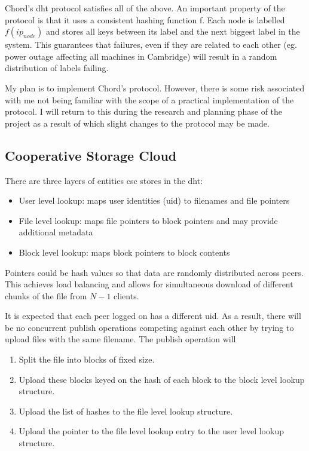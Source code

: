 \documentclass[12pt]{article}
\begin{document}
Chord's \gls{dht} protocol satisfies all of the above. \cite{chord} An important property of the protocol is that it uses a consistent hashing function f. Each node is labelled $f(ip_{node})$ and stores all keys between its label and the next biggest label in the system. This guarantees that failures, even if they are related to each other (eg. power outage affecting all machines in Cambridge) will result in a random distribution of labels failing.

My plan is to implement Chord's protocol. However, there is some risk associated with me not being familiar with the scope of a practical implementation of the protocol. I will return to this during the research and planning phase of the project as a result of which slight changes to the protocol may be made.

\subsection{Cooperative Storage Cloud}

There are three layers of entities \gls{csc} stores in the \gls{dht}:
\begin{itemize}
\item{User level lookup: maps user identities (\gls{uid}) to filenames and file pointers}
\item{File level lookup: maps file pointers to block pointers and may provide additional metadata}
\item{Block level lookup: maps block pointers to block contents}
\end{itemize}

Pointers could be hash values so that data are randomly distributed across peers. This achieves load balancing and allows for simultaneous download of different chunks of the file from $N-1$ clients.

It is expected that each peer logged on has a different \gls{uid}. As a result, there will be no concurrent publish operations competing against each other by trying to upload files with the same filename. The publish operation will 

\begin{enumerate}
\item{Split the file into blocks of fixed size.}
\item{Upload these blocks keyed on the hash of each block to the block level lookup structure.}
\item{Upload the list of hashes to the file level lookup structure.}
\item{Upload the pointer to the file level lookup entry to the user level lookup structure.}
\end{enumerate}
\end{document}
